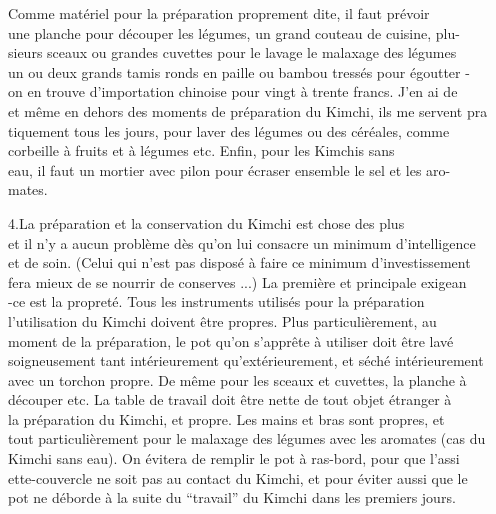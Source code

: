 Comme matériel pour la préparation proprement dite, il faut prévoir\\
une planche pour découper les légumes, un grand couteau de cuisine, plu-\\
sieurs sceaux ou grandes cuvettes pour le lavage  le malaxage des légumes\\
un ou deux grands tamis ronds en paille ou bambou tressés pour égoutter -\\
on en trouve d'importation chinoise pour vingt à trente francs. J'en ai de\\
et même en dehors des moments de préparation du Kimchi, ils me servent pra\unsure{-}\\
tiquement tous les jours, pour laver des légumes ou des céréales, comme\\
 corbeille à fruits et à légumes etc. Enfin, pour les Kimchis sans\\
eau, il faut un mortier avec pilon pour écraser ensemble le sel et les aro-\\
mates.

4.\quad La préparation et la conservation du Kimchi est chose des plus \\
et il n'y a aucun problème dès qu'on lui consacre un minimum d'intelligence\\
et de soin. (Celui qui n'est pas disposé à faire ce minimum d'investissement\\
fera mieux de se nourrir de conserves ...) La première et principale exigean\\
-ce est la propreté. Tous les instruments utilisés pour la préparation \\
l'utilisation du Kimchi doivent être propres. Plus particulièrement, au\\
moment de la préparation, le pot qu'on s'apprête à utiliser doit être lavé\\
soigneusement tant intérieurement qu'extérieurement, et séché intérieurement\\
avec un torchon propre. De même pour les sceaux et cuvettes, la planche à\\
découper etc. La table de travail doit être nette de tout objet étranger à\\
la préparation du Kimchi, et propre. Les mains et bras sont propres, et\\
tout particulièrement pour le malaxage des légumes avec les aromates (cas du\\
Kimchi sans eau). On évitera de remplir le pot à ras-bord, pour que l'assi\unsure{-}\\
ette-couvercle ne soit pas au contact du Kimchi, et pour éviter aussi que le\\
pot ne déborde à la suite du ``travail'' du Kimchi dans les premiers jours.

